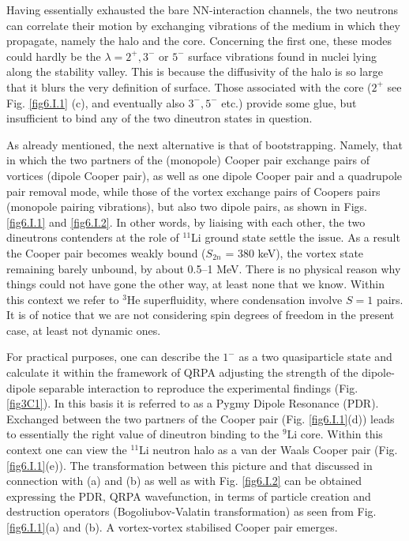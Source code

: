 \begin{subappendices}
Having essentially exhausted the bare NN-interaction channels, the two neutrons can correlate their motion by exchanging vibrations of the medium in which they propagate, namely  the halo and the core. Concerning the first one, these modes could hardly  be the $\lambda= 2^+,3^-$ or $5^-$ surface vibrations found in 
nuclei lying along the  stability valley. This is because the diffusivity of the halo is so large that it blurs the very definition of surface. Those associated with  the core ($ 2^+$ see Fig. \ref{fig6.I.1} (c), and eventually also $3^-,5^-$ etc.) provide some glue, but insufficient to bind any of the two dineutron states in question.

As already mentioned, the next alternative is that of bootstrapping. Namely, that in which the two partners of the  (monopole) Cooper pair exchange  pairs of vortices 
(dipole Cooper pair),  as well as one dipole Cooper pair and a quadrupole pair removal mode,
while those of the vortex exchange  pairs of Coopers pairs (monopole pairing vibrations), but also two dipole pairs, as shown in Figs. \ref{fig6.I.1} and \ref{fig6.I.2}.  In other words, by  liaising  with each other,  
the two dineutrons contenders at the role of $^{11}$Li ground state  settle the issue.  As a result  the Cooper pair becomes weakly bound ($S_{2n}$ = 380 keV), the vortex state remaining barely unbound, by about 0.5--1 MeV.
There is no physical reason why things could not have gone  the other way, at least none that we know. Within this context we refer to $^3$He superfluidity, where condensation involve $S=1$ pairs. It is of notice that we are not considering spin degrees of freedom in  the present case,
at least  not dynamic ones. 

For practical purposes, one can describe the  $1^-$ as a two quasiparticle state and calculate it within  the framework of QRPA adjusting the strength of the dipole-dipole separable interaction to reproduce the  experimental findings (Fig. \ref{fig3C1}). In this basis it is referred to  as a Pygmy Dipole  Resonance (PDR). Exchanged between the  two partners of the Cooper pair (Fig. \ref{fig6.I.1}(d)) leads to essentially the right value of  dineutron binding  to the $^9$Li core. Within this context  one can view the
$^{11}$Li neutron halo as a van der Waals Cooper pair (Fig. \ref{fig6.I.1}(e)). The transformation between this picture and  that discussed in connection with 
(a) and (b) as well as with Fig. \ref{fig6.I.2} can be obtained  expressing the PDR, QRPA wavefunction, in terms of particle  creation and destruction operators (Bogoliubov-Valatin transformation) as seen from Fig. \ref{fig6.I.1}(a) and (b). 
A vortex-vortex  stabilised Cooper pair emerges. 


\end{subappendices}
